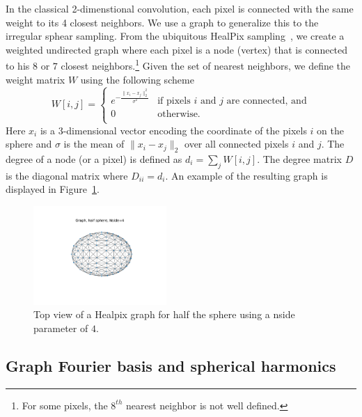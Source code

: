 \documentclass[preprint,12pt,authoryear]{elsarticle}
\newcommand{\assign}[1]{{\color[rgb]{.8,.5,.8}{Assigned: #1 }}}
\begin{document}
In the classical 2-dimenstional convolution, each pixel is connected with the
same weight to its 4 closest neighbors. We use a graph to generalize this to the
irregular sphear sampling. From the ubiquitous HealPix
sampling~\citep{gorski2005healpix}, we create a weighted undirected graph where
each pixel is a node (vertex) that is connected to his $8$ or $7$ closest
neighbors.\footnote{For some pixels, the $8^{th}$ nearest neighbor is not well
defined.} Given the set of nearest neighbors, we define the weight matrix $W$
using the following scheme
\begin{equation}
W[i,j]=\begin{cases}
e^{-\frac{\|x_i-x_j\|_2^2}{\sigma^2}} & \text{if pixels $i$ and $j$ are connected, and}\\
0 & \text{otherwise.}\\
\end{cases}
\end{equation}
Here $x_i$ is a 3-dimensional vector encoding the coordinate of the pixels $i$
on the sphere and $\sigma$ is the mean of $\|x_i-x_j\|_2$ over all connected
pixels $i$ and $j$. The degree of a node (or a pixel) is defined as $d_i =
\sum_j W[i,j]$. The degree matrix $D$ is the diagonal matrix where $D_{ii}=d_i$. 
An example of the resulting graph is displayed in Figure~\ref{fig:healpix_graph_4}.

\begin{figure}[!ht]
\centering
\includegraphics[width=0.45\textwidth]{figures/half_graph_4.pdf}
\caption{
Top view of a Healpix graph for half the sphere using a nside parameter of $4$.}
\label{fig:healpix_graph_4}
\end{figure}

\subsection{Graph Fourier basis and spherical harmonics}
\assign{Nathanaël}
\end{document}
